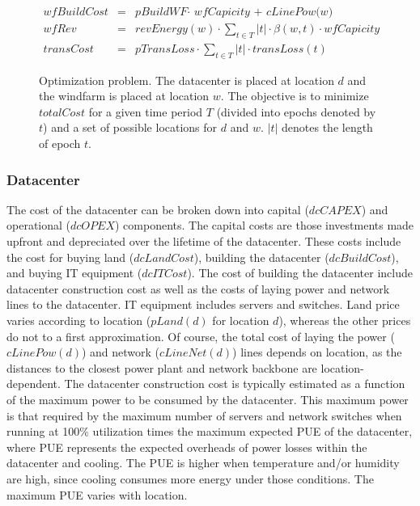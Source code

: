 \begin{figure}
\begin{scriptsize}
\begin{eqnarray}
  \textit{wfBuildCost}&=& \textit{pBuildWF} \cdot \textit{ wfCapicity + cLinePow(w)} \\
  \textit{wfRev}&=& \textit{revEnergy}(w) \cdot  \sum_{t \in T}{ |t| \cdot
                    \beta(w,t) \cdot  \textit{wfCapicity} } \\
  \textit{transCost}&=& \textit{pTransLoss} \cdot \sum_{t \in T}{ |t| \cdot  \textit{transLoss}(t)} %
\end{eqnarray}
\end{scriptsize}
\caption{Optimization problem.  The datacenter is placed at location $d$ and the windfarm is placed at location $w$.  The objective is to minimize $totalCost$ for a given time period $T$ (divided into epochs denoted by $t$) and a set of possible locations for $d$ and $w$.  $|t|$ denotes the length of epoch $t$.}
\label{fig:optimization}
\vspace{-0.2in}
\end{figure}




\subsubsection{Datacenter} The cost of the datacenter can be broken down into capital ($dcCAPEX$) and operational ($dcOPEX$) components.  The capital costs are those investments made upfront and depreciated over the lifetime of the datacenter.  These costs include the cost for buying land ($dcLandCost$), building the datacenter ($dcBuildCost$), and buying IT equipment ($dcITCost$).  The cost of building the datacenter include datacenter construction cost as well as the costs of laying power and network lines to the datacenter.  IT equipment includes servers and switches.  Land price varies according to location ($pLand(d)$ for location $d$), whereas the other prices do not to a first approximation.  Of course, the total cost of laying the power ($cLinePow(d)$) and network ($cLineNet(d)$) lines depends on location, as the distances to the closest power plant and network backbone are location-dependent.  The datacenter construction cost is typically estimated as a function of the maximum power to be consumed by the datacenter.  This maximum power is that required by the maximum number of servers and network switches when running at 100\% utilization times the maximum expected PUE of the datacenter, where PUE represents the expected overheads of power losses within the datacenter and cooling.
The PUE is higher when temperature and/or humidity are high, since cooling consumes more energy under those conditions.  The maximum PUE varies with location.

